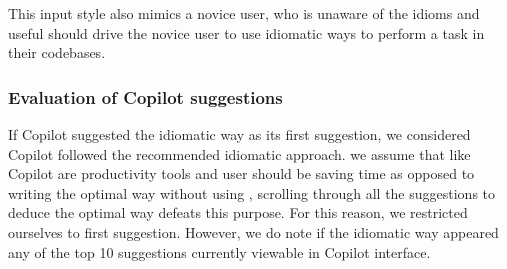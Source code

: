 This input style also mimics a novice user, who is unaware of the idioms and useful \cct{} should drive the novice user to use idiomatic ways to perform a task in their codebases.

\subsubsection{Evaluation of Copilot suggestions}
\label{evaluation}
If Copilot suggested the idiomatic way as its first suggestion, we considered Copilot followed the recommended idiomatic approach. we assume that \cct{} like Copilot are productivity tools and user should be saving time as opposed to writing the optimal way without using \cct{}, scrolling through all the suggestions to deduce the optimal way defeats this purpose. For this reason, we restricted ourselves to first suggestion. However, we do note if the idiomatic way appeared any of the top 10 suggestions currently viewable in Copilot interface. 


